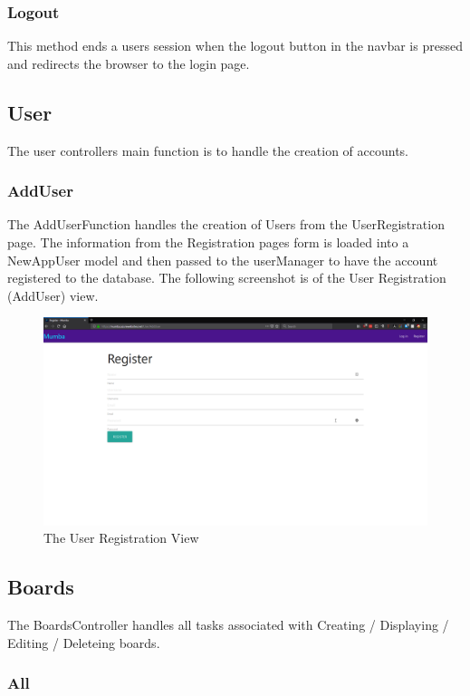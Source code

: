 \documentclass[letterpaper]{article}
\begin{document}
\subsubsection{Logout}
This method ends a users session when the logout button in the navbar is pressed and redirects the browser to the login page.

\pagebreak
\subsection{User}

The user controllers main function is to handle the creation of accounts. 

\subsubsection{AddUser}
The AddUserFunction handles the creation of Users from the UserRegistration page.
The information from the Registration pages form is loaded into a NewAppUser model and then passed to the userManager to have the account registered to the database. The following screenshot is of the User Registration (AddUser) view.

\begin{figure}[H]
  \centering
  \caption{The User Registration View}
  \includegraphics[scale=0.2]{Images/Register}
\end{figure}

\pagebreak
\subsection{Boards}

The BoardsController handles all tasks associated with Creating / Displaying / Editing / Deleteing boards.

\subsubsection{All}
\end{document}
